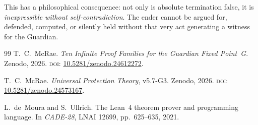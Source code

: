 This has a philosophical consequence: not only is absolute termination false, it is \emph{inexpressible without self-contradiction}. The ender cannot be argued for, defended, computed, or silently held without that very act generating a witness for the Guardian.

\bigskip

\begin{thebibliography}{99}
T.~C.~McRae.
\emph{Ten Infinite Proof Families for the Guardian Fixed Point~G}.
Zenodo, 2026.
\textsc{doi:} \href{https://doi.org/10.5281/zenodo.24612272}{10.5281/zenodo.24612272}.

T.~C.~McRae.
\emph{Universal Protection Theory}, v5.7-G3.
Zenodo, 2026.
\textsc{doi:} \href{https://doi.org/10.5281/zenodo.24573167}{10.5281/zenodo.24573167}.

L.~de~Moura and S.~Ullrich.
The Lean~4 theorem prover and programming language.
In \emph{CADE-28}, LNAI 12699, pp.~625--635, 2021.
\end{thebibliography}


